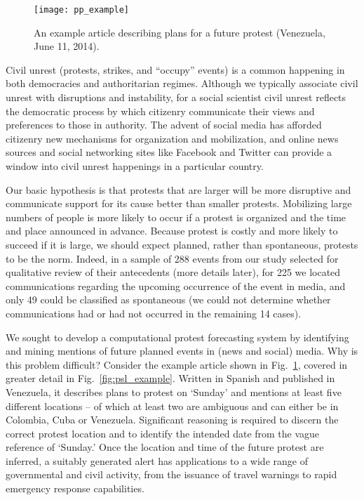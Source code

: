 \begin{figure}
    \texttt{[image: pp\_example]}
    \caption{An example article describing plans for a future protest (Venezuela, June 11, 2014).}
    \vspace{-2em}
    \label{pp_example}
\end{figure}
Civil unrest (protests, strikes, and ``occupy'' events) is a common happening in both democracies
and authoritarian regimes.
Although we typically associate civil unrest with disruptions and instability, for a social scientist
civil unrest reflects the democratic process by 
which citizenry communicate their views and preferences to those in authority. 
The advent of social
media has afforded citizenry new mechanisms for organization and mobilization, and online news sources
and social networking sites like Facebook and Twitter
can provide a window into civil unrest happenings in a particular country.

Our basic hypothesis is that
protests that are larger will be more disruptive and communicate support for its cause better than smaller protests. 
Mobilizing large numbers of people is more likely to occur if a protest is organized and the time and place announced in
advance. Because protest is costly and more likely to succeed if it is large, we should expect planned, rather than 
spontaneous, protests to be the norm. Indeed, in a sample of 288 events from our study selected for qualitative review of their antecedents
(more details later), for 225 we located communications regarding the upcoming occurrence of the event in media, and only 49 could be classified as 
spontaneous (we could not determine whether communications had or had not occurred in the remaining 14 cases).

We sought to develop
a computational protest forecasting system by
identifying and mining mentions of future planned events
in (news and social) media.  
Why is this problem difficult? Consider the example article shown in Fig.~\ref{pp_example},
covered in greater detail in Fig.~\ref{fig:psl_example}. Written in Spanish and published in Venezuela, it describes plans 
to protest on `Sunday' and mentions at least five different locations -- of which at least two are ambiguous and can either be in Colombia, Cuba or Venezuela. 
Significant reasoning is required to discern the correct protest location and to identify the intended date
from the vague reference of `Sunday.' Once the location and time of the future
protest are inferred, a suitably generated alert has applications to a wide range of 
governmental and civil activity, from the issuance of travel warnings
to rapid emergency response capabilities.  

